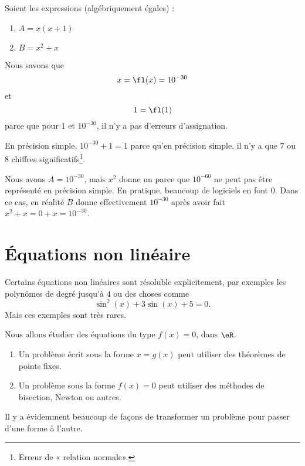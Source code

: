 \begin{exercice}
	Soient les expressions (algébriquement égales) :
	\begin{enumerate}
		\item
			\(A= x(x+1)\)
		\item
			\(B= x^2+x\)
	\end{enumerate}
	Nous savons que
	\begin{equation}
		x=\fl(x)=10^{-30}
	\end{equation}
	et
	\begin{equation}
		1=\fl(1)
	\end{equation}
	parce que pour \( 1\) et \( 10^{-30}\), il n'y a pas d'erreurs d'assignation.

	En précision simple, \( 10^{-30}+1=1\) parce qu'en précision simple, il n'y a que \( 7\) ou \( 8\) chiffres significatifs\footnote{Erreur de « relation normale».}.

	Nous avons $A=10^{-30}$, mais \( x^2\) donne un  parce que \( 10^{-60}\) ne peut pas être représenté en précision simple. En pratique, beaucoup de logiciels en font \( 0\). Dans ce cas, en réalité \( B\) donne effectivement \( 10^{-30}\) après avoir fait \( x^2+x=0+x=10^{-30}\).
\end{exercice}

\section{Équations non linéaire}

Certains équations non linéaires sont résoluble explicitement, par exemples les polynômes de degré jusqu'à \( 4\) ou des choses comme
\begin{equation}
	\sin^2(x)+3\sin(x)+5=0.
\end{equation}
Mais ces exemples sont très rares.

Nous allons étudier des équations du type \( f(x)=0\), dans \( \eR\).

\begin{enumerate}
	\item
Un problème écrit sous la forme \( x=g(x)\) peut utiliser des théorèmes de points fixes.
\item
	Un problème sous la forme \( f(x)=0\) peut utiliser des méthodes de bisection, Newton ou autres.
\end{enumerate}
Il y a évidemment beaucoup de façons de transformer un problème pour passer d'une forme à l'autre.

